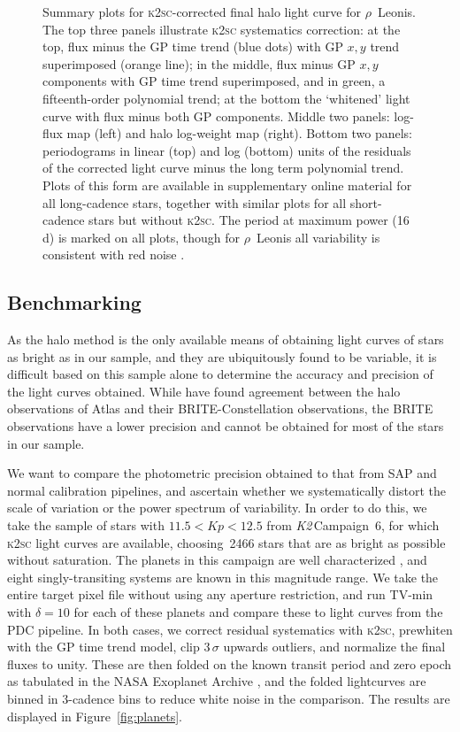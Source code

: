 \documentclass[modern]{aastex62}
\newcommand\ktwo{\emph{K2}\,}
\begin{document}

\begin{figure*}
\caption{Summary plots for \textsc{k2sc}-corrected final halo light curve for $\rho$~Leonis. The top three panels illustrate \textsc{k2sc} systematics correction: at the top, flux minus the GP time trend (blue dots) with GP $x,y$ trend superimposed (orange line); in the middle, flux minus GP $x,y$ components with GP time trend superimposed, and in green, a fifteenth-order polynomial trend; at the bottom the `whitened' light curve with flux minus both GP components. Middle two panels: log-flux map (left) and halo log-weight map (right). Bottom two panels: periodograms in linear (top) and log (bottom) units of the residuals of the corrected light curve minus the long term polynomial trend. Plots of this form are available in supplementary online material for all long-cadence stars, together with similar plots for all short-cadence stars but without \textsc{k2sc}. The period at maximum power (16\,d) is marked on all plots, though for $\rho$~Leonis all variability is consistent with red noise \citep{bowman19}.}
\label{fig:rholeo}
\end{figure*}

\subsection{Benchmarking}
\label{sec:benchmarking}

As the halo method is the only available means of obtaining light curves of stars as bright as in our sample, and they are ubiquitously found to be variable, it is difficult based on this sample alone to determine the accuracy and precision of the light curves obtained. While \citet{Kallinger2018} have found agreement between the \citet{White2017} halo observations of Atlas and their BRITE-Constellation observations, the BRITE observations have a lower precision and cannot be obtained for most of the stars in our sample. 

We want to compare the photometric precision obtained to that from SAP and normal calibration pipelines, and ascertain whether we systematically distort the scale of variation or the power spectrum of variability. In order to do this, we take the sample of stars with $11.5 <  Kp < 12.5$ from \ktwo Campaign~6, for which \textsc{k2sc} light curves are available, choosing~2466 stars that are as bright as possible without saturation. The planets in this campaign are well characterized \citep[e.g.][]{Pope2016planets}, and eight singly-transiting systems are known in this magnitude range. We take the entire target pixel file without using any aperture restriction, and run TV-min with $\delta = 10$ for each of these planets and compare these to light curves from the PDC pipeline. In both cases, we correct residual systematics with \textsc{k2sc}, prewhiten with the GP time trend model, clip $3\,\sigma$ upwards outliers, and normalize the final fluxes to unity. These are then folded on the known transit period and zero epoch as tabulated in the NASA Exoplanet Archive \citep{2013PASP..125..989A}, and the folded lightcurves are binned in 3-cadence bins to reduce white noise in the comparison. The results are displayed in Figure~\ref{fig:planets}.
\end{document}
